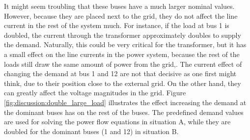 \documentclass[class=book, crop=false]{standalone}
\begin{document}
It might seem troubling that these buses have a much larger nominal values. However, because they are placed next to the grid, they do not affect the line current in the rest of the system much. For instance, if the load at bus 1 is doubled, the current through the transformer approximately doubles to supply the demand. Naturally, this could be very critical for the transformer, but it has a small effect on the line currents in the power system, because the rest of the loads still draw the same amount of power from the grid,. The current effect of changing the demand at bus 1 and 12 are not that decisive as one first might think, due to their position close to the external grid. On the other hand, they can greatly affect the voltage magnitudes in the grid. Figure \ref{fig:discussion:double_large_load} illustrates the effect increasing the demand at the dominant buses has on the rest of the buses. The predefined demand values are used for solving the power flow equations in situation A, while they are doubled for the dominant buses (1 and 12) in situation B.
\end{document}
